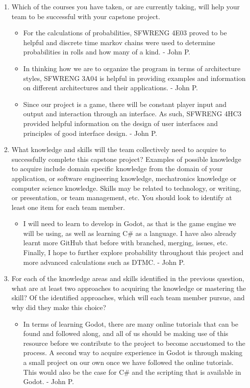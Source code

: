 \begin{enumerate}
  \item Which of the courses you have taken, or are currently taking, will help
  your team to be successful with your capstone project.
  
	\begin{itemize}
		\item For the calculations of probabilities, SFWRENG 4E03 proved to be helpful and discrete time markov chains were used to determine probabilities in rolls and how many of a kind. - John P.
		\item In thinking how we are to organize the program in terms of architecture styles, SFWRENG 3A04 is helpful in providing examples and information on different architectures and their applications. - John P.
		\item Since our project is a game, there will be constant player input and output and interaction through an interface. As such, SFWRENG 4HC3 provided helpful information on the design of user interfaces and principles of good interface design. - John P.
	\end{itemize}    
  
  \item What knowledge and skills will the team collectively need to acquire to
  successfully complete this capstone project?  Examples of possible knowledge
  to acquire include domain specific knowledge from the domain of your
  application, or software engineering knowledge, mechatronics knowledge or
  computer science knowledge.  Skills may be related to technology, or writing,
  or presentation, or team management, etc.  You should look to identify at
  least one item for each team member.
  
	\begin{itemize}
		\item I will need to learn to develop in Godot, as that is the game engine we will be using, as well as learning C\# as a language. I have also already learnt more GitHub that before with branched, merging, issues, etc. Finally, I hope to further explore probability throughout this project and more advanced calculations such as DTMC. - John P.
	\end{itemize}    
  
  \item For each of the knowledge areas and skills identified in the previous
  question, what are at least two approaches to acquiring the knowledge or
  mastering the skill?  Of the identified approaches, which will each team
  member pursue, and why did they make this choice?
  
	\begin{itemize}
		\item In terms of learning Godot, there are many online tutorials that can be found and followed along, and all of us should be making use of this resource before we contribute to the project to become accustomed to the process. A second way to acquire experience in Godot is through making a small project on our own once we have followed the online tutorials. This would also be the case for C\# and the scripting that is available in Godot. - John P.
	\end{itemize}    
  
\end{enumerate}